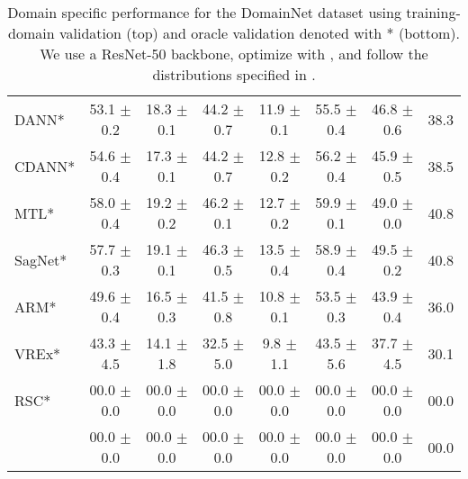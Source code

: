 \begin{table*}
\begin{center}
\begin{tabular}{lccccccc}
DANN*                 & 53.1 $\pm$ 0.2       & 18.3 $\pm$ 0.1       & 44.2 $\pm$ 0.7       & 11.9 $\pm$ 0.1       & 55.5 $\pm$ 0.4       & 46.8 $\pm$ 0.6       & 38.3                 \\
CDANN*                & 54.6 $\pm$ 0.4       & 17.3 $\pm$ 0.1       & 44.2 $\pm$ 0.7       & 12.8 $\pm$ 0.2       & 56.2 $\pm$ 0.4       & 45.9 $\pm$ 0.5       & 38.5                 \\
MTL*                  & 58.0 $\pm$ 0.4       & 19.2 $\pm$ 0.2       & 46.2 $\pm$ 0.1       & 12.7 $\pm$ 0.2       & 59.9 $\pm$ 0.1       & 49.0 $\pm$ 0.0       & 40.8                 \\
SagNet*               & 57.7 $\pm$ 0.3       & 19.1 $\pm$ 0.1       & 46.3 $\pm$ 0.5       & 13.5 $\pm$ 0.4       & 58.9 $\pm$ 0.4       & 49.5 $\pm$ 0.2       & 40.8                 \\
ARM*                  & 49.6 $\pm$ 0.4       & 16.5 $\pm$ 0.3       & 41.5 $\pm$ 0.8       & 10.8 $\pm$ 0.1       & 53.5 $\pm$ 0.3       & 43.9 $\pm$ 0.4       & 36.0                 \\
VREx*                 & 43.3 $\pm$ 4.5       & 14.1 $\pm$ 1.8       & 32.5 $\pm$ 5.0       & 9.8 $\pm$ 1.1        & 43.5 $\pm$ 5.6       & 37.7 $\pm$ 4.5       & 30.1                 \\
RSC*                  & 00.0 $\pm$ 0.0       & 00.0 $\pm$ 0.0        & 00.0 $\pm$ 0.0       & 00.0 $\pm$ 0.0     & 00.0 $\pm$ 0.0         & 00.0 $\pm$ 0.0     & 00.0                 \\
\tdivcams 	   & 00.0 $\pm$ 0.0       & 00.0 $\pm$ 0.0        & 00.0 $\pm$ 0.0       & 00.0 $\pm$ 0.0      & 00.0 $\pm$ 0.0	 & 00.0 $\pm$ 0.0  & 00.0                 \\
\bottomrule
\end{tabular}
\caption[Domain specific performance for the DomainNet dataset]{Domain specific performance for the DomainNet dataset using training-domain validation (top) and  oracle validation denoted with * (bottom). We use a ResNet-50 backbone, optimize with \adam, and follow the distributions specified in \domainbed.}
\end{center}
\end{table*}